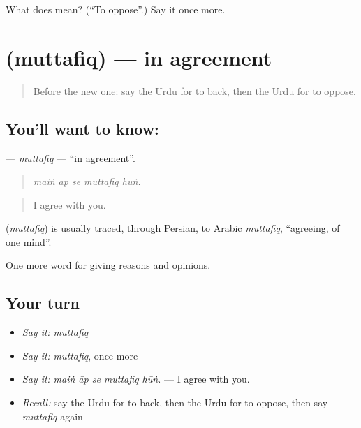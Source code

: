 \begin{tcolorbox}[breakable,colback=teal!4,colframe=teal!35!black,title={Before you move on}]
What does   mean? (\textquotedblleft{}To oppose\textquotedblright{}.) Say it once more.
\end{tcolorbox}
\section[\texorpdfstring{\ur{متفق} (muttafiq)}{متفق (muttafiq)}]{ (muttafiq) — in agreement}

\label{lesson:UR-C335-muttafiq}



\begin{quote}
Before the new one: say the Urdu for to back, then the Urdu for to oppose.
\end{quote}

\subsection*{You'll want to know: }
\textbf{} — \emph{muttafiq} — \textquotedblleft{}in agreement\textquotedblright{}.

\begin{quote}
    
\end{quote}

\begin{quote}
\emph{maiṅ āp se muttafiq hūṅ.}
\end{quote}

\begin{quote}
I agree with you.
\end{quote}

\begin{cousinweb}
\textbf{} (\emph{muttafiq}) is usually traced, through Persian, to Arabic \emph{muttafiq}, \textquotedblleft{}agreeing, of one mind\textquotedblright{}.
\end{cousinweb}

\begin{grammarlens}[title={What you've built}]
One more word for giving reasons and opinions.
\end{grammarlens}

\subsection*{Your turn}
\begin{itemize}
\raggedright
  \item \emph{Say it:} \emph{muttafiq}
  \item \emph{Say it:} \emph{muttafiq}, once more
  \item \emph{Say it:} \emph{maiṅ āp se muttafiq hūṅ.} — I agree with you.
  \item \emph{Recall:} say the Urdu for to back, then the Urdu for to oppose, then say \emph{muttafiq} again
\end{itemize}

